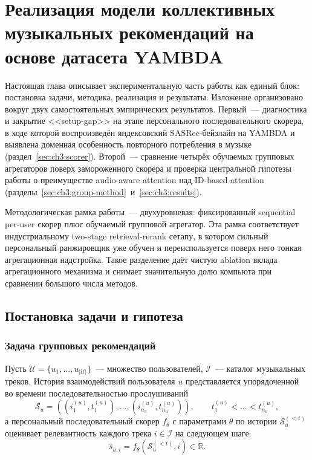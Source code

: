 \chapter{Реализация модели коллективных музыкальных рекомендаций на основе датасета YAMBDA}
\label{ch:experiment}

Настоящая глава описывает экспериментальную часть работы как единый блок: постановка задачи, методика, реализация и результаты. Изложение организовано вокруг двух самостоятельных эмпирических результатов. Первый~--- диагностика и закрытие <<setup-gap>> на этапе персонального последовательного скорера, в ходе которой воспроизведён яндексовский SASRec-бейзлайн на YAMBDA и выявлена доменная особенность повторного потребления в музыке (раздел~\ref{sec:ch3:scorer}). Второй~--- сравнение четырёх обучаемых групповых агрегаторов поверх замороженного скорера и проверка центральной гипотезы работы о преимуществе audio-aware attention над ID-based attention (разделы~\ref{sec:ch3:group-method}~и~\ref{sec:ch3:results}).

Методологическая рамка работы~--- двухуровневая: фиксированный sequential per-user скорер плюс обучаемый групповой агрегатор. Эта рамка соответствует индустриальному two-stage retrieval-rerank сетапу, в котором сильный персональный ранжировщик уже обучен и переиспользуется поверх него тонкая агрегационная надстройка. Такое разделение даёт чистую ablation вклада агрегационного механизма и снимает значительную долю компьюта при сравнении большого числа методов.

\section{Постановка задачи и гипотеза}\label{sec:ch3:setup}

\subsection{Задача групповых рекомендаций}

Пусть $\mathcal{U} = \{u_1, \ldots, u_{|\mathcal{U}|}\}$~--- множество пользователей, $\mathcal{I}$~--- каталог музыкальных треков. История взаимодействий пользователя $u$ представляется упорядоченной во времени последовательностью прослушиваний
\begin{equation*}
    \mathcal{S}_u = \left( (i_1^{(u)}, t_1^{(u)}), \ldots, (i_{n_u}^{(u)}, t_{n_u}^{(u)}) \right), \qquad t_1^{(u)} < \ldots < t_{n_u}^{(u)},
\end{equation*}
а персональный последовательный скорер $f_\theta$ с параметрами $\theta$ по истории $\mathcal{S}_u^{(<t)}$ оценивает релевантность каждого трека $i \in \mathcal{I}$ на следующем шаге:
\begin{equation*}
    \hat{s}_{u, i} = f_\theta\!\left( \mathcal{S}_u^{(<t)}, i \right) \in \mathbb{R}.
\end{equation*}

